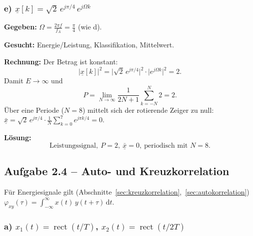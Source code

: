 \subsubsection*{e) $\underline{x}[k] = \sqrt{2}\,e^{j\pi/4}\,e^{j\Omega k}$}

\begin{beispiel}

\textbf{Gegeben:} $\Omega=\tfrac{2\pi f}{f_A}=\tfrac{\pi}{4}$ (wie d).

\textbf{Gesucht:} Energie/Leistung, Klassifikation, Mittelwert.

\textbf{Rechnung:} Der Betrag ist konstant:
$$
|\underline{x}[k]|^2 = \big|\sqrt{2}\,e^{j\pi/4}\big|^2\cdot\big|e^{j\Omega k}\big|^2 = 2.
$$
Damit $E\to\infty$ und
$$
P = \lim_{N\to\infty}\frac{1}{2N+1}\sum_{k=-N}^{N} 2 = 2.
$$
Über eine Periode ($N=8$) mittelt sich der rotierende Zeiger zu null:
$\bar{\underline{x}} = \sqrt2\,e^{j\pi/4}\cdot\tfrac1N\sum_{k=0}^{7} e^{j\pi k/4}=0$.

\textbf{Lösung:}
$$
\boxed{\;\text{Leistungssignal},\ P=2,\ \bar{\underline{x}}=0,\ \text{periodisch mit } N=8.\;}
$$
\end{beispiel}

\subsection*{Aufgabe 2.4 – Auto- und Kreuzkorrelation}

Für Energiesignale gilt (Abschnitte~\ref{sec:kreuzkorrelation},~\ref{sec:autokorrelation})
$\varphi_{xy}(\tau)=\int_{-\infty}^{\infty} x(t)\,y(t+\tau)\,\mathrm{d}t$.

\subsubsection*{a) $x_1(t)=\operatorname{rect}(t/T)$, $x_2(t)=\operatorname{rect}(t/2T)$}

